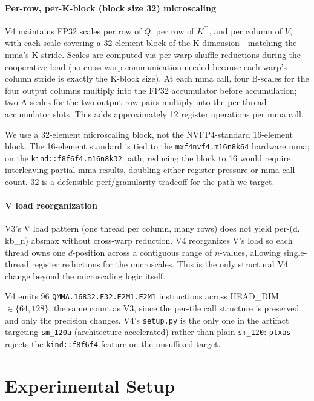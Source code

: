 \documentclass[conference]{IEEEtran}
\begin{document}
\paragraph*{Per-row, per-K-block (block size 32) microscaling}
V4 maintains FP32 scales per row of $Q$, per row of $K^\top$, and
per column of $V$, with each scale covering a 32-element block of
the K dimension---matching the mma's K-stride. Scales are computed
via per-warp shuffle reductions during the cooperative load (no
cross-warp communication needed because each warp's column stride
is exactly the K-block size). At each mma call, four B-scales for
the four output columns multiply into the FP32 accumulator before
accumulation; two A-scales for the two output row-pairs multiply
into the per-thread accumulator slots. This adds approximately
12 register operations per mma call.

We use a 32-element microscaling block, not the NVFP4-standard
16-element block. The 16-element standard is tied to the
\texttt{mxf4nvf4.m16n8k64} hardware mma; on the
\texttt{kind::f8f6f4.m16n8k32} path, reducing the block to 16 would
require interleaving partial mma results, doubling either register
pressure or mma call count. 32 is a defensible perf/granularity
tradeoff for the path we target.

\paragraph*{V load reorganization}
V3's V load pattern (one thread per column, many rows) does not
yield per-(d, kb\_n) absmax without cross-warp reduction. V4
reorganizes V's load so each thread owns one $d$-position across a
contiguous range of $n$-values, allowing single-thread register
reductions for the microscales. This is the only structural V4
change beyond the microscaling logic itself.

V4 emits 96 \texttt{QMMA.16832.F32.E2M1.E2M1} instructions across
HEAD\_DIM $\in \{64, 128\}$, the same count as V3, since the
per-tile call structure is preserved and only the precision
changes. V4's \texttt{setup.py} is the only one in the artifact
targeting \texttt{sm\_120a} (architecture-accelerated) rather than
plain \texttt{sm\_120}: \texttt{ptxas} rejects the
\texttt{kind::f8f6f4} feature on the unsuffixed target.

\section{Experimental Setup}
\label{sec:exp}
\end{document}
